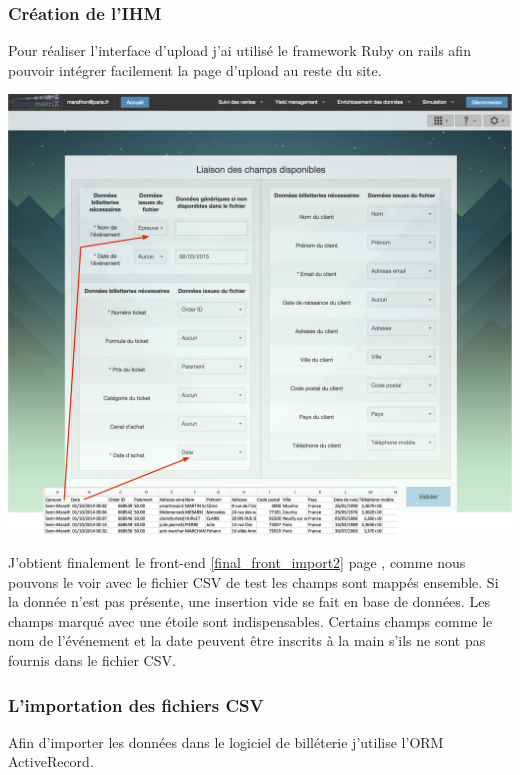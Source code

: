 \subsubsection{Création de l'IHM}
Pour réaliser l'interface d'upload j'ai utilisé le framework Ruby on rails afin pouvoir intégrer facilement la page d'upload au reste du site.

\begin{center}
\includegraphics[scale=0.37]{images/final_front2.png}
\label{final_front_import2}
\end{center}

J'obtient finalement le front-end \ref{final_front_import2} page \pageref{final_front_import2}, comme nous pouvons le voir avec le fichier CSV de test les champs sont mappés ensemble. Si la donnée n'est pas présente, une insertion vide se fait en base de données. Les champs marqué avec une étoile sont indispensables. Certains champs comme le nom de l'événement et la date peuvent être inscrits à la main s’ils ne sont pas fournis dans le fichier CSV.


\subsubsection{L'importation des fichiers CSV}

Afin d'importer les données dans le logiciel de billéterie j'utilise l'ORM ActiveRecord.

